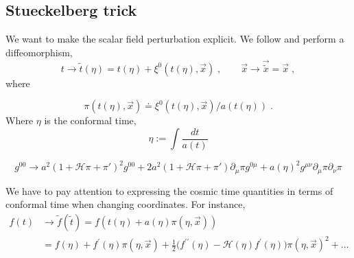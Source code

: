 \documentclass[a4paper,11pt]{article}
\def\be{\begin{equation}}
\def\ee{\end{equation}}
\newcommand{\HH}{\mathcal H}
\newcommand{\MP}{M_{\rm Pl}}
\begin{document}
\subsection{Stueckelberg trick}
We want to make the scalar field perturbation explicit. We follow \cite{Hassani_2019} and perform  a diffeomorphism,  
\be
\label{time_diff}
t \to \tilde t(\eta) = t(\eta)+ \xi^0 (t (\eta) , \vec x) \;, \qquad \vec x \to \vec {\tilde x} = \vec x  \; ,
\ee
where

\be
\pi(t(\eta),\vec x) \doteq \xi^0 (t(\eta),\vec x) /a (t(\eta)) \;.
\ee 
Where $\eta$ is the conformal time,
\be
\eta:=\int \frac{d t}{a (t)}
\ee

\begin{equation}
g^{00} \rightarrow a^2 (1+ \HH \pi +  \pi')^2 g^{00}+2 a^2 (1+  \HH \pi +  \pi')  \partial_{\mu} \pi  g^{0 \mu}+ a(\eta)^2 g^{\mu \nu} \partial_{\mu} \pi \partial_{\nu} \pi
\end{equation}


We have to pay attention to expressing the cosmic time quantities in terms of conformal time when changing coordinates.
For instance,
\begin{align}
f(t) & \to \tilde f(\tilde t) = f(t(\eta) + a(\eta) \pi(\eta ,\vec x)) \\ \nonumber & 
 = f(\eta)+f^{\prime}(\eta) \pi(\eta, \vec{x})+\frac{1}{2} \Big(f^{\prime \prime}(\eta)- \HH(\eta) f^{\prime}(\eta)  \Big) \pi(\eta,\vec x)^{2} + ...
\end{align}
\end{document}
